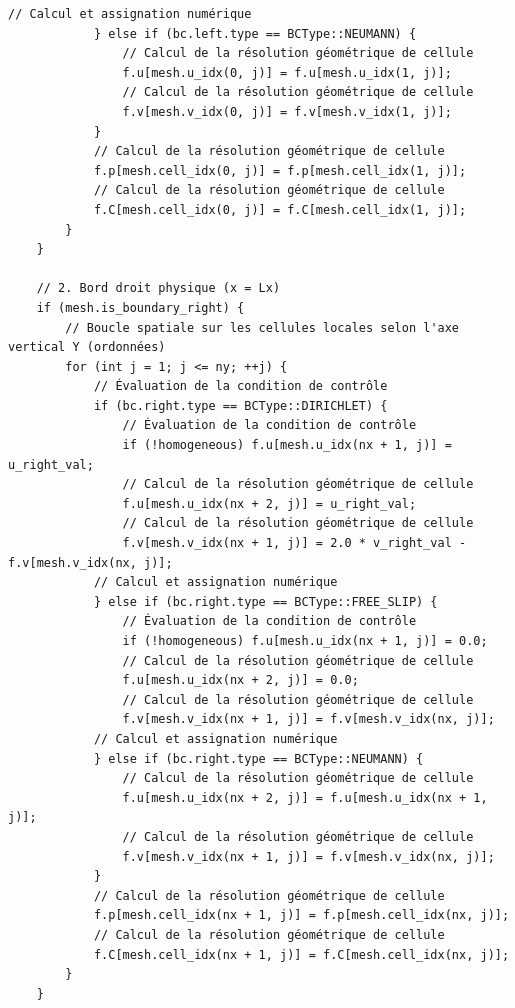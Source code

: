 \documentclass[10pt,a4paper,oneside]{book}
\begin{document}
\begin{lstlisting}[language={[11]C++}]
            // Calcul et assignation numérique
            } else if (bc.left.type == BCType::NEUMANN) {
                // Calcul de la résolution géométrique de cellule
                f.u[mesh.u_idx(0, j)] = f.u[mesh.u_idx(1, j)];
                // Calcul de la résolution géométrique de cellule
                f.v[mesh.v_idx(0, j)] = f.v[mesh.v_idx(1, j)];
            }
            // Calcul de la résolution géométrique de cellule
            f.p[mesh.cell_idx(0, j)] = f.p[mesh.cell_idx(1, j)];
            // Calcul de la résolution géométrique de cellule
            f.C[mesh.cell_idx(0, j)] = f.C[mesh.cell_idx(1, j)];
        }
    }

    // 2. Bord droit physique (x = Lx)
    if (mesh.is_boundary_right) {
        // Boucle spatiale sur les cellules locales selon l'axe vertical Y (ordonnées)
        for (int j = 1; j <= ny; ++j) {
            // Évaluation de la condition de contrôle
            if (bc.right.type == BCType::DIRICHLET) {
                // Évaluation de la condition de contrôle
                if (!homogeneous) f.u[mesh.u_idx(nx + 1, j)] = u_right_val;
                // Calcul de la résolution géométrique de cellule
                f.u[mesh.u_idx(nx + 2, j)] = u_right_val;
                // Calcul de la résolution géométrique de cellule
                f.v[mesh.v_idx(nx + 1, j)] = 2.0 * v_right_val - f.v[mesh.v_idx(nx, j)];
            // Calcul et assignation numérique
            } else if (bc.right.type == BCType::FREE_SLIP) {
                // Évaluation de la condition de contrôle
                if (!homogeneous) f.u[mesh.u_idx(nx + 1, j)] = 0.0;
                // Calcul de la résolution géométrique de cellule
                f.u[mesh.u_idx(nx + 2, j)] = 0.0;
                // Calcul de la résolution géométrique de cellule
                f.v[mesh.v_idx(nx + 1, j)] = f.v[mesh.v_idx(nx, j)];
            // Calcul et assignation numérique
            } else if (bc.right.type == BCType::NEUMANN) {
                // Calcul de la résolution géométrique de cellule
                f.u[mesh.u_idx(nx + 2, j)] = f.u[mesh.u_idx(nx + 1, j)];
                // Calcul de la résolution géométrique de cellule
                f.v[mesh.v_idx(nx + 1, j)] = f.v[mesh.v_idx(nx, j)];
            }
            // Calcul de la résolution géométrique de cellule
            f.p[mesh.cell_idx(nx + 1, j)] = f.p[mesh.cell_idx(nx, j)];
            // Calcul de la résolution géométrique de cellule
            f.C[mesh.cell_idx(nx + 1, j)] = f.C[mesh.cell_idx(nx, j)];
        }
    }


\end{lstlisting}
\end{document}
